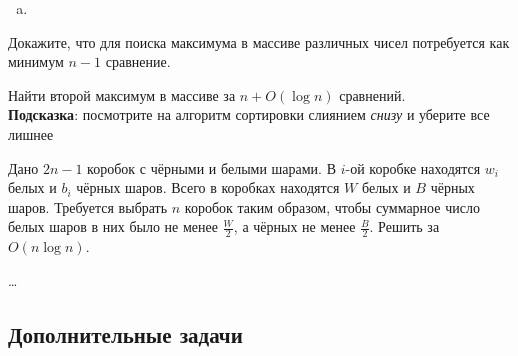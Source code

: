 \begin{solution}
    \leavevmode\vspace{1pt}
    \begin{enumerate}[a)]
        \item
        
    \end{enumerate}
\end{solution}


\begin{problem}
    Докажите, что для поиска максимума в массиве различных чисел потребуется как минимум $n-1$ сравнение.
\end{problem}

\begin{solution}
    \leavevmode\vspace{1pt}
    
\end{solution}


\begin{problem}
    Найти второй максимум в массиве за $n + O(\log n)$ сравнений. \\
    {\footnotesize \textbf{Подсказка}: посмотрите на алгоритм сортировки слиянием \textit{снизу} и уберите все лишнее}
\end{problem}

\begin{solution}
    \leavevmode\vspace{1pt}
    
\end{solution}


\begin{problem}
    Дано $2n - 1$ коробок с чёрными и белыми шарами.  В $i$-ой коробке находятся $w_i$ белых и $b_i$ чёрных шаров.
    Всего в коробках находятся $W$ белых и $B$ чёрных шаров.
    Требуется выбрать $n$ коробок таким образом, чтобы суммарное число белых шаров в них было не менее $\frac{W}{2}$,
    а чёрных не менее $\frac{B}{2}$. Решить за $O(n \log n)$.
\end{problem}

\begin{solution}
    \dots
\end{solution}


\subsection*{Дополнительные задачи}

